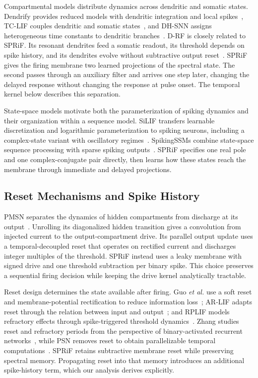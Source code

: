 \documentclass[letterpaper,journal]{IEEEtran}
\begin{document}
Compartmental models distribute dynamics across dendritic and somatic states. Dendrify provides reduced models with dendritic integration and local spikes~\cite{dendrify}, TC-LIF couples dendritic and somatic states~\cite{tclif}, and DH-SNN assigns heterogeneous time constants to dendritic branches~\cite{dhsnn}. D-RF is closely related to SPRiF. Its resonant dendrites feed a somatic readout, its threshold depends on spike history, and its dendrites evolve without subtractive output reset~\cite{drf}. SPRiF gives the firing membrane two learned projections of the spectral state. The second passes through an auxiliary filter and arrives one step later, changing the delayed response without changing the response at pulse onset. The temporal kernel below describes this separation.

State-space models motivate both the parameterization of spiking dynamics and their organization within a sequence model. SiLIF transfers learnable discretization and logarithmic parameterization to spiking neurons, including a complex-state variant with oscillatory regimes~\cite{silif}. SpikingSSMs combine state-space sequence processing with sparse spiking outputs~\cite{spikingssms}. SPRiF specifies one real pole and one complex-conjugate pair directly, then learns how these states reach the membrane through immediate and delayed projections.

\subsection{Reset Mechanisms and Spike History}

PMSN separates the dynamics of hidden compartments from discharge at its output~\cite{pmsn2026}. Unrolling its diagonalized hidden transition gives a convolution from injected current to the output-compartment drive. Its parallel output update uses a temporal-decoupled reset that operates on rectified current and discharges integer multiples of the threshold. SPRiF instead uses a leaky membrane with signed drive and one threshold subtraction per binary spike. This choice preserves a sequential firing decision while keeping the drive kernel analytically tractable.

Reset design determines the state available after firing. Guo \emph{et al.} use a soft reset and membrane-potential rectification to reduce information loss~\cite{inflor}; AR-LIF adapts reset through the relation between input and output~\cite{arlif}; and RPLIF models refractory effects through spike-triggered threshold dynamics~\cite{rplif}. Zhang studies reset and refractory periods from the perspective of binary-activated recurrent networks~\cite{zhang2025reset}, while PSN removes reset to obtain parallelizable temporal computations~\cite{psn}. SPRiF retains subtractive membrane reset while preserving spectral memory. Propagating reset into that memory introduces an additional spike-history term, which our analysis derives explicitly.
\end{document}
